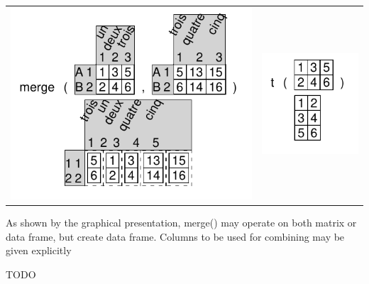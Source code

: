 \documentclass[pdflatex]{article}
\begin{document}
\begin{tabular}{cc}
\includegraphics{merge.pdf} & \includegraphics{t.pdf}\\
\end{tabular}

As shown by the graphical presentation, merge() may operate on both matrix or
data frame, but create data frame. Columns to be used for combining may be
given explicitly




%
% 


TODO
\end{document}
